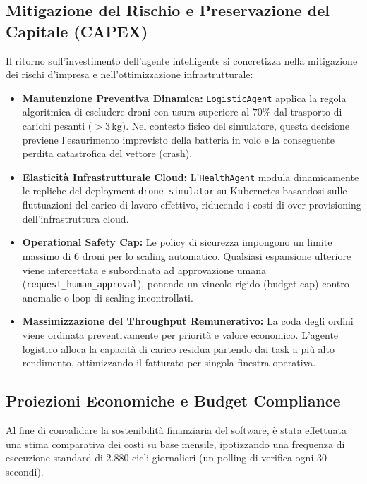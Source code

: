 \subsection{Mitigazione del Rischio e Preservazione del Capitale (CAPEX)}
Il ritorno sull'investimento dell'agente intelligente si concretizza nella mitigazione dei rischi d'impresa e nell'ottimizzazione infrastrutturale:
\begin{itemize}
    \item \textbf{Manutenzione Preventiva Dinamica:} \texttt{LogisticAgent} applica la regola algoritmica di escludere droni con usura superiore al $70\%$ dal trasporto di carichi pesanti ($>3$\,kg). Nel contesto fisico del simulatore, questa decisione previene l'esaurimento imprevisto della batteria in volo e la conseguente perdita catastrofica del vettore (crash).
    \item \textbf{Elasticità Infrastrutturale Cloud:} L'\texttt{HealthAgent} modula dinamicamente le repliche del deployment \texttt{drone-simulator} su Kubernetes basandosi sulle fluttuazioni del carico di lavoro effettivo, riducendo i costi di over-provisioning dell'infrastruttura cloud.
    \item \textbf{Operational Safety Cap:} Le policy di sicurezza impongono un limite massimo di 6 droni per lo scaling automatico. Qualsiasi espansione ulteriore viene intercettata e subordinata ad approvazione umana (\texttt{request\_human\_approval}), ponendo un vincolo rigido (budget cap) contro anomalie o loop di scaling incontrollati.
    \item \textbf{Massimizzazione del Throughput Remunerativo:} La coda degli ordini viene ordinata preventivamente per priorità e valore economico. L'agente logistico alloca la capacità di carico residua partendo dai task a più alto rendimento, ottimizzando il fatturato per singola finestra operativa.
\end{itemize}

\label{sec:opex_budget}

\subsection*{Proiezioni Economiche e Budget Compliance}
Al fine di convalidare la sostenibilità finanziaria del software, è stata effettuata una stima comparativa dei costi su base mensile, ipotizzando una frequenza di esecuzione standard di 2.880 cicli giornalieri (un polling di verifica ogni 30 secondi).


